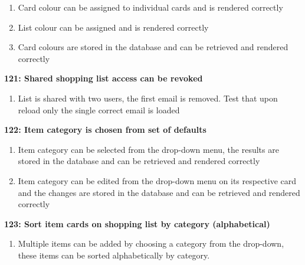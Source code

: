 \documentclass[10pt,onecolumn]{witseiepaper}
\begin{document}
\begin{enumerate}
\item Card colour can be assigned to individual cards and is rendered correctly
\item List colour can be assigned and is rendered correctly
\item Card colours are stored in the database and can be retrieved and rendered correctly
\end{enumerate}

\textbf{121: Shared shopping list access can be revoked}

\begin{enumerate}
	\item List is shared with two users, the first email is removed. Test that upon reload only the single correct email is loaded
\end{enumerate}

\textbf{122: Item category is chosen from set of defaults}

\begin{enumerate}
	\item Item category can be selected from the drop-down menu, the results are stored in the database and can be retrieved and rendered correctly
	\item Item category can be edited from the drop-down menu on its respective card and the changes are stored in the database and can be retrieved and rendered correctly
\end{enumerate}

\textbf{123: Sort item cards on shopping list by category (alphabetical)}

\begin{enumerate}
	\item Multiple items can be added by choosing a category from the drop-down, these items can be sorted alphabetically by category.
\end{enumerate}
\end{document}
